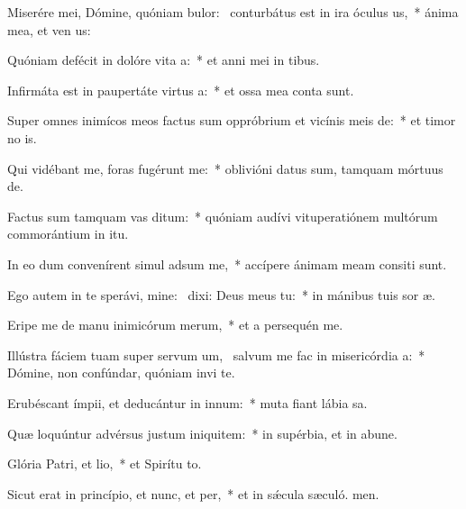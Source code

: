 \item Miserére mei, Dómine, quóniam bulor:~\pscross{} conturbátus est in ira óculus us,~* ánima mea, et ven us:
\item Quóniam defécit in dolóre vita a:~* et anni mei in tibus.
\item Infirmáta est in paupertáte virtus a:~* et ossa mea conta sunt.
\item Super omnes inimícos meos factus sum oppróbrium et vicínis meis de:~* et timor no is.
\item Qui vidébant me, foras fugérunt  me:~* oblivióni datus sum, tamquam mórtuus  de.
\item Factus sum tamquam vas ditum:~* quóniam audívi vituperatiónem multórum commorántium in itu.
\item In eo dum convenírent simul adsum me,~* accípere ánimam meam consiti sunt.
\item Ego autem in te sperávi, mine:~\pscross{} dixi: Deus meus  tu:~* in mánibus tuis sor æ.
\item Eripe me de manu inimicórum merum,~* et a persequén me.
\item Illústra fáciem tuam super servum um,~\pscross{} salvum me fac in misericórdia a:~* Dómine, non confúndar, quóniam invi te.
\item Erubéscant ímpii, et deducántur in innum:~* muta fiant lábia sa.
\item Quæ loquúntur advérsus justum iniquitem:~* in supérbia, et in abune.
\item Glória Patri, et lio,~* et Spirítu to.
\item Sicut erat in princípio, et nunc, et per,~* et in sǽcula sæculó. men.
